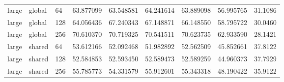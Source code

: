 \begin{longtable}{lllrrrrrr}
large & global & 64 & 63.877099 & 63.548581 & 64.241614 & 63.889098 & 56.995765 & 31.1086 \\
large & global & 128 & 64.056436 & 67.240343 & 67.148871 & 66.148550 & 58.795722 & 30.0460 \\
large & global & 256 & 70.610370 & 70.719325 & 70.541511 & 70.623735 & 62.933590 & 28.1421 \\
large & shared & 64 & 53.612166 & 52.092468 & 51.982892 & 52.562509 & 45.852661 & 37.8122 \\
large & shared & 128 & 52.584853 & 52.593450 & 52.589473 & 52.589259 & 44.960373 & 37.7929 \\
large & shared & 256 & 55.785773 & 54.331579 & 55.912601 & 55.343318 & 48.190422 & 35.9122 \\
\end{longtable}\normalsize
